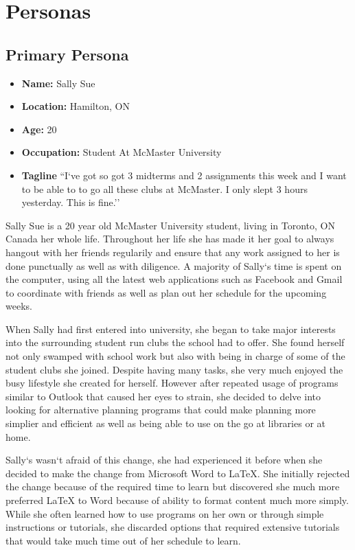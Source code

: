 \documentclass{sigchi}
\begin{document}
\section{Personas}

\subsection{Primary Persona}
\begin{itemize}
	\item \textbf{Name:} Sally Sue
	\item \textbf{Location:} Hamilton, ON
	\item \textbf{Age:} 20
	\item \textbf{Occupation:} Student At McMaster University
	\item \textbf{Tagline} ``I`ve got so got 3 midterms and 2 assignments this week and I want to be able to to go all these clubs at McMaster. I only slept 3 hours yesterday. This is fine.''
\end{itemize}

		Sally Sue is a 20 year old McMaster University student, living in Toronto, ON Canada her whole life. Throughout her life she has made it her goal to always hangout with her friends regularily and ensure that any work assigned to her is done punctually as well as with diligence. A majority of Sally`s time is spent on the computer, using all the latest web applications such as Facebook and Gmail to coordinate with friends as well as plan out her schedule for the upcoming weeks.

		When Sally had first entered into university, she began to take major interests into the surrounding student run clubs the school had to offer. She found herself not only swamped with school work but also with being in charge of some of the student clubs she joined. Despite having many tasks, she very much enjoyed the busy lifestyle she created for herself. However after repeated usage of programs similar to Outlook that caused her eyes to strain, she decided to delve into looking for alternative planning programs that could make planning more simplier and efficient as well as being able to use on the go at libraries or at home.

		Sally`s wasn`t afraid of this change, she had experienced it before when she decided to make the change from Microsoft Word to LaTeX. She initially rejected the change because of the required time to learn but discovered she much more preferred LaTeX to Word because of ability to format content much more simply. While she often learned how to use programs on her own or through simple instructions or tutorials, she discarded options that required extensive tutorials that would take much time out of her schedule to learn.
\end{document}
